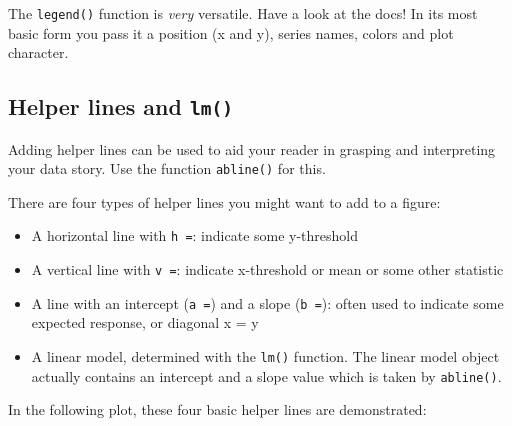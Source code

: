 \documentclass[]{book}
\providecommand{\tightlist}{%
  \setlength{\itemsep}{0pt}\setlength{\parskip}{0pt}}
\begin{document}
The \texttt{legend()} function is \emph{very} versatile. Have a look at the docs!
In its most basic form you pass it a position (x and y), series names, colors and plot character.

\hypertarget{helper-lines-and-lm}{%
\subsection{\texorpdfstring{Helper lines and \texttt{lm()}}{Helper lines and lm()}}\label{helper-lines-and-lm}}

Adding helper lines can be used to aid your reader in grasping and interpreting your data story.
Use the function \texttt{abline()} for this.

There are four types of helper lines you might want to add to a figure:

\begin{itemize}
\tightlist
\item
  A horizontal line with \texttt{h\ =}: indicate some y-threshold
\item
  A vertical line with \texttt{v\ =}: indicate x-threshold or mean or some other statistic
\item
  A line with an intercept (\texttt{a\ =}) and a slope (\texttt{b\ =}): often used to indicate some expected response, or diagonal x = y
\item
  A linear model, determined with the \texttt{lm()} function. The linear model object actually contains an intercept and a slope value which is taken by \texttt{abline()}.
\end{itemize}

In the following plot, these four basic helper lines are demonstrated:
\end{document}
